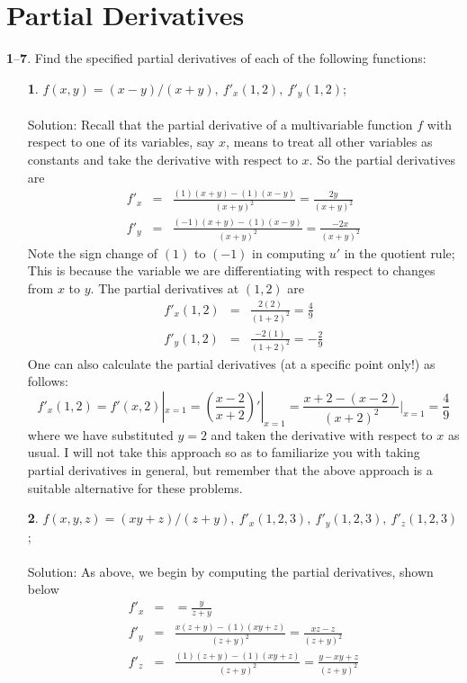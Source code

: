 \documentclass[12pt]{amsbook}
\begin{document}
\section{Partial Derivatives}
\noindent
{\small {\bf 1}--{\bf 7}}. Find the specified partial derivatives of each of the following functions:
\begin{enumerate}
\item[{\small\bf 1}.] $f(x,y)= (x-y)/(x+y) , \ f'_x(1,2), \ f'_y(1,2) $;
\\
\\
{\sc Solution}: Recall that the partial derivative of a multivariable function $f$ with respect to one of its variables, say $x$, means to treat all other variables as constants and take the derivative with respect to $x$. So the partial derivatives are
\begin{eqnarray*}
f'_x&=&\frac{(1)(x+y)-(1)(x-y)}{(x+y)^2}=\frac{2y}{(x+y)^2} \\
f'_y&=&\frac{(-1)(x+y)-(1)(x-y)}{(x+y)^2}=\frac{-2x}{(x+y)^2} 
\end{eqnarray*}
Note the sign change of $(1)$ to $(-1)$ in computing $u'$ in the quotient rule; This is because the variable we are differentiating with respect to changes from $x$ to $y$. The partial derivatives at $(1,2)$ are
\begin{eqnarray*}
f'_x(1,2)&=&\frac{2(2)}{(1+2)^2}=\frac{4}{9} \\
f'_y(1,2)&=&\frac{-2(1)}{(1+2)^2}=-\frac{2}{9} 
\end{eqnarray*}
One can also calculate the partial derivatives (at a specific point only!) as follows:
$$f'_x(1,2)=f'(x,2) |_{x=1}=(\frac{x-2}{x+2})' |_{x=1}=\frac{x+2-(x-2)}{(x+2)^2}|_{x=1}=\frac{4}{9}$$
where we have substituted $y=2$ and taken the derivative with respect to $x$ as usual. I will not take this approach so as to familiarize you with taking partial derivatives in general, but remember that the above approach is a suitable alternative for these problems.
\\
\item[{\small\bf 2}.] $f(x,y,z)= (xy+z)/(z+y), \ f'_x(1,2,3), \ f'_y(1,2,3), \ f'_z(1,2,3) $;
\\
\\
{\sc Solution}: As above, we begin by computing the partial derivatives, shown below
\begin{eqnarray*}
f'_x&=&=\frac{y}{z+y} \\
f'_y&=&\frac{x(z+y)-(1)(xy+z)}{(z+y)^2}=\frac{xz-z}{(z+y)^2} \\
f'_z&=&\frac{(1)(z+y)-(1)(xy+z)}{(z+y)^2}=\frac{y-xy+z}{(z+y)^2}

\end{eqnarray*}
\end{enumerate}
\end{document}
